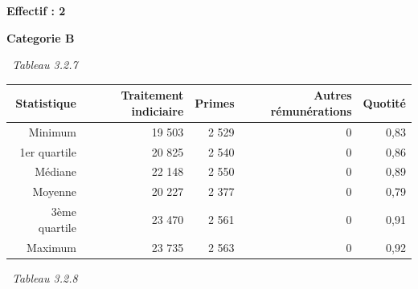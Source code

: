 \textbf{Effectif : 2 }

\textbf{Categorie B}

~\emph{Tableau 3.2.7}

\begin{longtable}[]{@{}rrrrr@{}}
\toprule
Statistique & Traitement indiciaire & Primes & Autres rémunérations &
Quotité\tabularnewline
\midrule
\endhead
Minimum & 19 503 & 2 529 & 0 & 0,83\tabularnewline
1er quartile & 20 825 & 2 540 & 0 & 0,86\tabularnewline
Médiane & 22 148 & 2 550 & 0 & 0,89\tabularnewline
Moyenne & 20 227 & 2 377 & 0 & 0,79\tabularnewline
3ème quartile & 23 470 & 2 561 & 0 & 0,91\tabularnewline
Maximum & 23 735 & 2 563 & 0 & 0,92\tabularnewline
\bottomrule
\end{longtable}

~\emph{Tableau 3.2.8}

